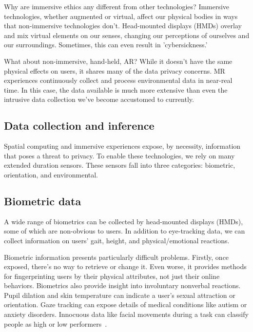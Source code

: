 Why are immersive ethics any different from other technologies? Immersive technologies, whether augmented or virtual, affect our physical bodies in ways that non-immersive technologies don't. Head-mounted displays (HMDs) overlay and mix virtual elements on our senses, changing our perceptions of ourselves and our surroundings. Sometimes, this can even result in 'cybersickness.'

What about non-immersive, hand-held, AR? While it doesn't have the same physical effects on users, it shares many of the data privacy concerns. MR experiences continuously collect and process environmental data in near-real time. In this case, the data available is much more extensive than even the intrusive data collection we've become accustomed to currently.

\subsection{Data collection and inference}
Spatial computing and immersive experiences expose, by necessity, information that poses a threat to privacy. To enable these technologies, we rely on many extended duration sensors. These sensors fall into three categories: biometric, orientation, and environmental.

\subsection{Biometric data}\label{sec:biometrics}
A wide range of biometrics can be collected by head-mounted displays (HMDs), some of which are non-obvious to users. In addition to eye-tracking data, we can collect information on users' gait, height, and physical/emotional reactions.

Biometric information presents particularly difficult problems. Firstly, once exposed, there's no way to retrieve or change it. Even worse, it provides methods for fingerprinting users by their physical attributes, not just their online behaviors. Biometrics also provide insight into involuntary nonverbal reactions\cite{bailenson2018protecting}. Pupil dilation and skin temperature can indicate a user's sexual attraction or orientation. Gaze tracking can expose details of medical conditions like autism or anxiety disorders. Innocuous data like facial movements during a task can classify people as high or low performers~\cite{jabon2011automatically}.

